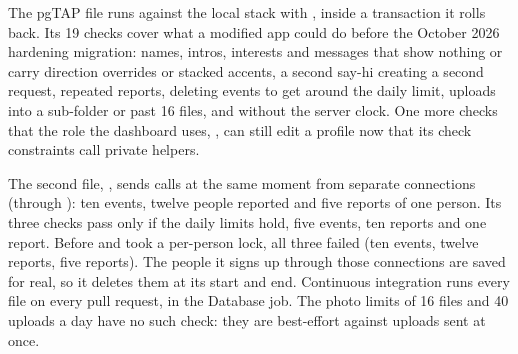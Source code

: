 The pgTAP file  runs against the local stack with
, inside a transaction it rolls back. Its 19 checks cover what a modified app could do
before the October 2026 hardening migration: names, intros, interests and messages that show nothing
or carry direction overrides or stacked accents, a second say-hi creating a second request, repeated
reports, deleting events to get around the daily limit, uploads into a sub-folder or past 16 files, and
 without the server clock. One more checks that the role the dashboard uses,
, can still edit a profile now that its check constraints call private helpers.

The second file, , sends calls at the same moment from separate connections (through ): ten events, twelve people
reported and five reports of one person. Its three checks pass only if the daily limits hold, five
events, ten reports and one report. Before  and  took a per-person
lock, all three failed (ten events, twelve reports, five reports). The people it signs up through those
connections are saved for real, so it deletes them at its start and end. Continuous integration runs
every file on every pull request, in the Database job. The photo limits of 16 files and 40 uploads a day
have no such check: they are best-effort against uploads sent at once.

